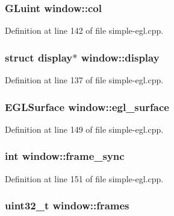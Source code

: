 \subsubsection[{\texorpdfstring{col}{col}}]{\setlength{\rightskip}{0pt plus 5cm}G\+Luint window\+::col}\hypertarget{structwindow_aef10fe94766ccd4831ee611c5ad0e55c}{}\label{structwindow_aef10fe94766ccd4831ee611c5ad0e55c}


Definition at line 142 of file simple-\/egl.\+cpp.

\subsubsection[{\texorpdfstring{display}{display}}]{\setlength{\rightskip}{0pt plus 5cm}struct {\bf display}$\ast$ window\+::display}\hypertarget{structwindow_a129486f2bd23791194f389ca1405cfd4}{}\label{structwindow_a129486f2bd23791194f389ca1405cfd4}


Definition at line 137 of file simple-\/egl.\+cpp.

\subsubsection[{\texorpdfstring{egl\+\_\+surface}{egl_surface}}]{\setlength{\rightskip}{0pt plus 5cm}E\+G\+L\+Surface window\+::egl\+\_\+surface}\hypertarget{structwindow_a8de0059f3f1cb0dec33fba1143b7dee1}{}\label{structwindow_a8de0059f3f1cb0dec33fba1143b7dee1}


Definition at line 149 of file simple-\/egl.\+cpp.

\subsubsection[{\texorpdfstring{frame\+\_\+sync}{frame_sync}}]{\setlength{\rightskip}{0pt plus 5cm}int window\+::frame\+\_\+sync}\hypertarget{structwindow_a851bcb65083f5ab5ff768b09522bed70}{}\label{structwindow_a851bcb65083f5ab5ff768b09522bed70}


Definition at line 151 of file simple-\/egl.\+cpp.

\subsubsection[{\texorpdfstring{frames}{frames}}]{\setlength{\rightskip}{0pt plus 5cm}uint32\+\_\+t window\+::frames}\hypertarget{structwindow_a633864bb495ec265bee220a5c70cc98f}{}\label{structwindow_a633864bb495ec265bee220a5c70cc98f}


